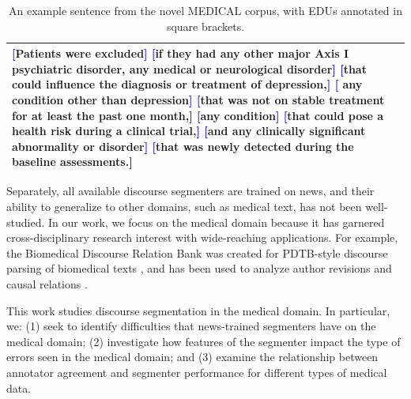 \begin{table}[t]
    \centering
    \begin{tabular}{p{10.5cm}}
    \toprule
    \textcolor{blue}{{\textbf{[}}}Patients were excluded{\textcolor{blue}{\textbf{]}}}
\textcolor{blue}{{\textbf{[}}}if they had any other major Axis I psychiatric disorder, any medical or neurological disorder{\textcolor{blue}{\textbf{]}}}
\textcolor{blue}{{\textbf{[}}}that could influence the diagnosis or treatment of depression,{\textcolor{blue}{\textbf{]}}}
\textcolor{blue}{{\textbf{[}}} any condition other than depression{\textcolor{blue}{\textbf{]}}}
\textcolor{blue}{{\textbf{[}}}that was not on stable treatment for at least the past one month,{\textcolor{blue}{\textbf{]}}}
\textcolor{blue}{{\textbf{[}}}any condition{\textcolor{blue}{\textbf{]}}}
\textcolor{blue}{{\textbf{[}}}that could pose a health risk during a clinical trial,{\textcolor{blue}{\textbf{]}}}
\textcolor{blue}{{\textbf{[}}}and any clinically significant abnormality or disorder{\textcolor{blue}{\textbf{]}}}
\textcolor{blue}{{\textbf{[}}}that was newly detected during the baseline assessments.{\textcolor{blue}{\textbf{]}}}  \\
    \bottomrule
    \end{tabular}
    \vspace{-0.6em}
    \caption{An example sentence from the novel \textsc{MEDICAL} corpus, with EDUs annotated in square brackets.}
    \label{tab:corpus_example}
\end{table}

Separately, all available discourse segmenters are trained on news, and their ability to generalize to other domains, such as medical text, has not been well-studied. In our work, we focus on the medical domain because it has garnered cross-disciplinary research interest with wide-reaching applications. For example, the Biomedical Discourse Relation Bank was created for PDTB-style discourse parsing of biomedical texts \cite{Prasad:2011}, and has been used to analyze author revisions and causal relations \cite{Zhang:2016,Marsi:2014}.


This work studies discourse segmentation in the medical domain. In particular, we: (1) seek to identify difficulties that news-trained segmenters have on the medical domain; (2) investigate how features of the segmenter impact the type of errors seen in the medical domain; and (3) examine the relationship between annotator agreement and segmenter performance for different types of medical data.

